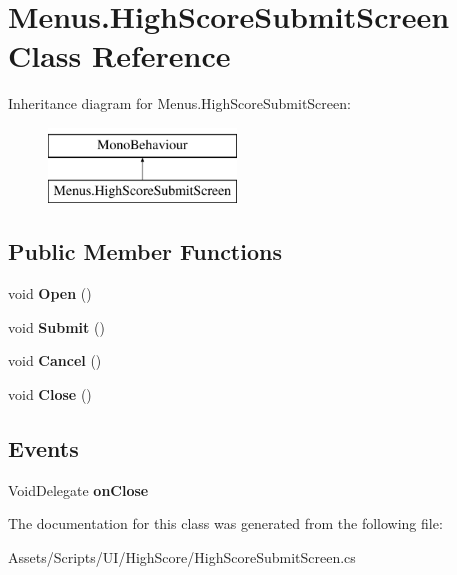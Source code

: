 \hypertarget{class_menus_1_1_high_score_submit_screen}{}\section{Menus.\+High\+Score\+Submit\+Screen Class Reference}
\label{class_menus_1_1_high_score_submit_screen}
Inheritance diagram for Menus.\+High\+Score\+Submit\+Screen\+:\begin{figure}[H]
\begin{center}
\leavevmode
\includegraphics[height=2.000000cm]{class_menus_1_1_high_score_submit_screen}
\end{center}
\end{figure}
\subsection*{Public Member Functions}
\begin{DoxyCompactItemize}
\item 
void {\bfseries Open} ()\hypertarget{class_menus_1_1_high_score_submit_screen_adab4198bdc0053b59cb6a3da0a0c70e7}{}\label{class_menus_1_1_high_score_submit_screen_adab4198bdc0053b59cb6a3da0a0c70e7}

\item 
void {\bfseries Submit} ()\hypertarget{class_menus_1_1_high_score_submit_screen_a996f795250986263f1dc173cc2b5e288}{}\label{class_menus_1_1_high_score_submit_screen_a996f795250986263f1dc173cc2b5e288}

\item 
void {\bfseries Cancel} ()\hypertarget{class_menus_1_1_high_score_submit_screen_ab60152aa7d1bf96cc792f96d62a4cb03}{}\label{class_menus_1_1_high_score_submit_screen_ab60152aa7d1bf96cc792f96d62a4cb03}

\item 
void {\bfseries Close} ()\hypertarget{class_menus_1_1_high_score_submit_screen_a0ebeed644044395b4b86fcc90252cf4a}{}\label{class_menus_1_1_high_score_submit_screen_a0ebeed644044395b4b86fcc90252cf4a}

\end{DoxyCompactItemize}
\subsection*{Events}
\begin{DoxyCompactItemize}
\item 
Void\+Delegate {\bfseries on\+Close}\hypertarget{class_menus_1_1_high_score_submit_screen_abc17caf0db722b74ea43529a597234a2}{}\label{class_menus_1_1_high_score_submit_screen_abc17caf0db722b74ea43529a597234a2}

\end{DoxyCompactItemize}


The documentation for this class was generated from the following file\+:\begin{DoxyCompactItemize}
\item 
Assets/\+Scripts/\+U\+I/\+High\+Score/High\+Score\+Submit\+Screen.\+cs\end{DoxyCompactItemize}
